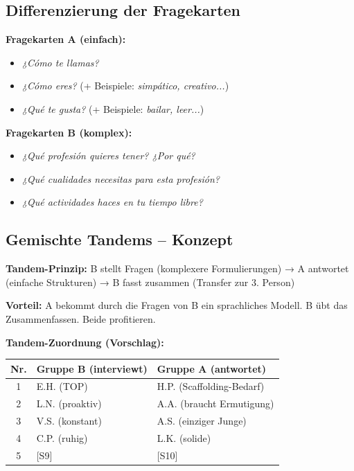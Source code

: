 \documentclass[11pt, a4paper]{article}
\newcommand{\es}[1]{\textcolor{spanisch}{\textit{#1}}}
\begin{document}
\subsection{Differenzierung der Fragekarten}

\textbf{Fragekarten A (einfach):}
\begin{itemize}[leftmargin=2em, nosep]
    \item \es{¿Cómo te llamas?}
    \item \es{¿Cómo eres?} (+ Beispiele: \es{simpático, creativo...})
    \item \es{¿Qué te gusta?} (+ Beispiele: \es{bailar, leer...})
\end{itemize}

\textbf{Fragekarten B (komplex):}
\begin{itemize}[leftmargin=2em, nosep]
    \item \es{¿Qué profesión quieres tener? ¿Por qué?}
    \item \es{¿Qué cualidades necesitas para esta profesión?}
    \item \es{¿Qué actividades haces en tu tiempo libre?}
\end{itemize}

\subsection{Gemischte Tandems -- Konzept}

\begin{infobox}
\textbf{Tandem-Prinzip:} B stellt Fragen (komplexere Formulierungen) → A antwortet (einfache Strukturen) → B fasst zusammen (Transfer zur 3. Person)

\textbf{Vorteil:} A bekommt durch die Fragen von B ein sprachliches Modell. B übt das Zusammenfassen. Beide profitieren.
\end{infobox}

\textbf{Tandem-Zuordnung (Vorschlag):}

\begin{center}
\begin{tabular}{|c|l|l|}
    \hline
    \textbf{Nr.} & \textbf{Gruppe B (interviewt)} & \textbf{Gruppe A (antwortet)} \\
    \hline
    1 & E.H. (TOP) & H.P. (Scaffolding-Bedarf) \\
    \hline
    2 & L.N. (proaktiv) & A.A. (braucht Ermutigung) \\
    \hline
    3 & V.S. (konstant) & A.S. (einziger Junge) \\
    \hline
    4 & C.P. (ruhig) & L.K. (solide) \\
    \hline
    5 & [S9] & [S10] \\
    \hline
\end{tabular}
\end{center}
\end{document}
